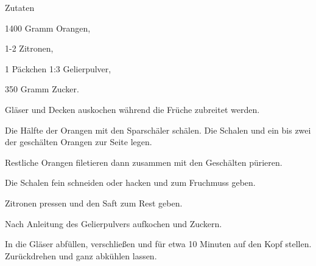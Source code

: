 \startsection[title={Orangenmarmelade},reference=cujamara]

\startitemize
\item Zutaten
      \startitemize
      \item 1400 Gramm Orangen,
      \item 1-2 Zitronen,
      \item 1 Päckchen 1:3 Gelierpulver,
      \item 350 Gramm Zucker.
      \stopitemize

\item Gläser und Decken auskochen während die Früche zubreitet werden.
\item Die Hälfte der Orangen mit den Sparschäler schälen. Die Schalen
      und ein bis zwei der geschälten Orangen zur Seite legen.
\item Restliche Orangen filetieren dann zusammen mit den Geschälten
      pürieren.
\item Die Schalen fein schneiden oder hacken und zum Fruchmuss geben.
\item Zitronen pressen und den Saft zum Rest geben.
\item Nach Anleitung des Gelierpulvers aufkochen und Zuckern.
\item In die Gläser abfüllen, verschließen und für etwa 10 Minuten
      auf den Kopf stellen. Zurückdrehen und ganz abkühlen lassen.
\stopitemize

\stopsection
